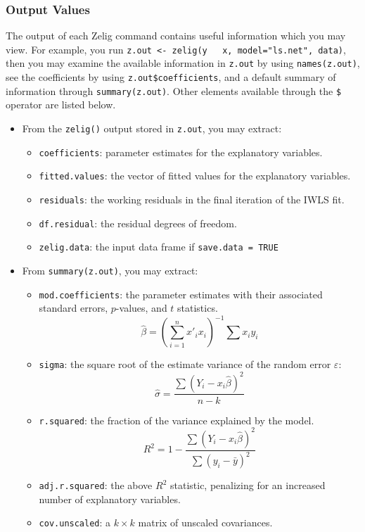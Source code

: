 \subsubsection{Output Values}

The output of each Zelig command contains useful information which you
may view. For example, you run {\tt z.out <- zelig(y ~ x,
model="ls.net", data)}, then you may examine the available information
in {\tt z.out} by using {\tt names(z.out)}, see the coefficients by
using {\tt z.out\$coefficients}, and a default summary of information
through {\tt summary(z.out)}. Other elements available through the
{\tt \$} operator are listed below. 
\begin{itemize}
\item From the {\tt zelig()} output stored in {\tt z.out}, you may extract:
\begin{itemize}
\item {\tt coefficients}: parameter estimates for the explanatory variables.
\item {\tt fitted.values}: the vector of fitted values for the explanatory variables.
\item {\tt residuals}: the working residuals in the final iteration of the IWLS fit. 
\item {\tt df.residual}: the residual degrees of freedom.
\item {\tt zelig.data}: the input data frame if {\tt save.data = TRUE}
\end{itemize}

\item From {\tt summary(z.out)}, you may extract:
\begin{itemize}
\item {\tt mod.coefficients}: the parameter estimates with their associated standard errors, $p$-values, and $t$ statistics. 
\begin{equation*}
\hat{\beta} = \left( \sum_{i = 1}^{n} x'_{i}x_{i}  \right)^{-1} \sum x_{i}y_{i}
\end{equation*}
\item {\tt sigma}: the square root of the estimate variance of the
random error $\varepsilon$:
\begin{equation*}
\hat{\sigma} = \frac{\sum (Y_{i} - x_{i} \hat{\beta} ) ^{2}}{n - k}
\end{equation*}
\item {\tt r.squared}: the fraction of the variance explained by the model.
\begin{equation*}
R^{2} = 1 - \frac{\sum (Y_{i} - x_{i} \hat{\beta} ) ^{2}}{\sum (y_{i}
- \bar{y})^{2}}
\end{equation*}
\item {\tt adj.r.squared}: the above $R^{2}$ statistic, penalizing for
an increased number of explanatory variables.  
\item {\tt cov.unscaled}: a $k \times k$ matrix of unscaled covariances. 
\end{itemize}


\end{itemize}
